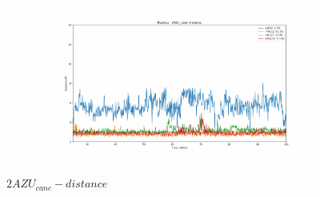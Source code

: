 \documentclass[fleqn,10pt]{wlscirep}
\begin{document}
\begin{figure}[!ht]
\begin{subfigure}{.45\textwidth}
  \end{subfigure}
    \begin{subfigure}{.45\textwidth}
     \centering
     \includegraphics[width=.95\linewidth]{2AZU_canc/2AZU_canc-dist_3.pdf}
  \end{subfigure}
\caption{$2AZU_{canc}-distance$}
\label{sup:2AZU_canc-dist}
\end{figure}
\end{document}
